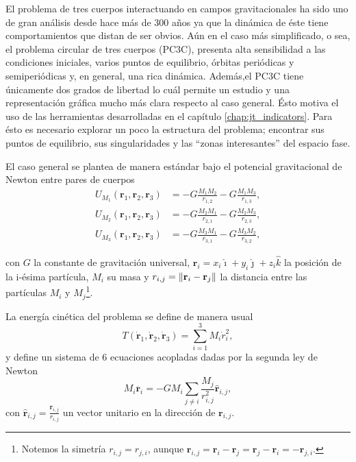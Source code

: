 El problema de tres cuerpos interactuando en campos gravitacionales ha sido uno de gran análisis desde hace más de 300 años ya que la dinámica de éste tiene comportamientos que distan de ser obvios. Aún en el caso más simplificado, o sea, el problema circular de tres cuerpos (PC3C), presenta alta sensibilidad a las condiciones iniciales, varios puntos de equilibrio, órbitas periódicas y semiperiódicas y, en general, una rica dinámica. Además,el PC3C tiene únicamente dos grados de libertad lo cuál permite un estudio y una representación gráfica mucho más clara respecto al caso general. Ésto motiva el uso de las herramientas desarrolladas en el capítulo \ref{chap:jt_indicators}. Para ésto es necesario explorar un poco la estructura del problema; encontrar sus puntos de equilibrio, sus singularidades y las ``zonas interesantes'' del espacio fase.

El caso general se plantea de manera estándar bajo el potencial gravitacional de Newton entre pares de cuerpos 
\begin{align}
 U_{M_1}(\mathbf{r}_1,\mathbf{r}_2,\mathbf{r}_3) &= -G \frac{M_1 M_2}{r_{1,2}} - G \frac{M_1 M_3}{r_{1,3}}, \\
 U_{M_2}(\mathbf{r}_1,\mathbf{r}_2,\mathbf{r}_3) &= -G \frac{M_2 M_1}{r_{2,1}} - G \frac{M_2 M_3}{r_{2,3}}, \\
 U_{M_3}(\mathbf{r}_1,\mathbf{r}_2,\mathbf{r}_3) &= -G \frac{M_3 M_1}{r_{3,1}} - G \frac{M_3 M_2}{r_{3,2}},
 \label{eq:3body_potential}
\end{align}

con $G$ la constante de gravitación universal, $\mathbf{r}_i = x_i \hat{\imath} + y_i \hat{\jmath} + z_i \hat{k}$ la posición de la i-ésima partícula, $M_i$ su masa y $r_{i,j} = \left\lVert \mathbf{r}_i - \mathbf{r}_j\right\rVert$ la distancia entre las partículas $M_i$ y $M_j$\footnote{Notemos la simetría $r_{i,j} = r_{j,i}$, aunque $\mathbf{r}_{i,j} = \mathbf{r}_i - \mathbf{r}_j = \mathbf{r}_j - \mathbf{r}_i  = - \mathbf{r}_{j,i}$.}. 

La energía cinética del problema se define de manera usual 
\begin{equation}
 T(\dot{\mathbf{r}}_1,\dot{\mathbf{r}}_2,\dot{\mathbf{r}}_3) = \sum_{i=1}^3 M_i \dot{r}_i^2,
 \label{eq:3body_kinetic}
\end{equation}
y define un sistema de 6 ecuaciones acopladas dadas por la segunda ley de Newton
\begin{equation}
 M_i \ddot{\mathbf{r}_i} = - G M_i \sum_{j\neq i} \frac{M_j}{r_{i,j}^2} \hat{\mathbf{r}}_{i,j},
 \label{eq:3body_eqs_motion}
\end{equation}
con $\hat{\mathbf{r}}_{i,j} = \frac{\mathbf{r}_{i,j}}{r_{i,j}}$ un vector unitario en la dirección de $\mathbf{r}_{i,j}$.

